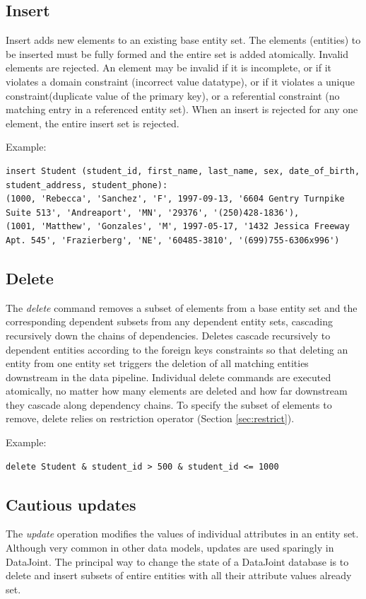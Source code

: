\documentclass[letter,10pt]{article}
\newcommand{\datajoint}{DataJoint\xspace}
\begin{document}
\subsection{Insert}
Insert adds new elements to an existing base entity set.  
The elements (entities) to be inserted must be fully formed and the entire set is added atomically.
Invalid elements are rejected. 
An element may be invalid if it is incomplete, or if it violates a domain constraint (incorrect value datatype), or if it violates a unique constraint(duplicate value of the primary key), or a referential constraint (no matching entry in a referenced entity set).
When an insert is rejected for any one element, the entire insert set is rejected.

Example:
\begin{lstlisting}[language=dj]
insert Student (student_id, first_name, last_name, sex, date_of_birth, student_address, student_phone):
(1000, 'Rebecca', 'Sanchez', 'F', 1997-09-13, '6604 Gentry Turnpike Suite 513', 'Andreaport', 'MN', '29376', '(250)428-1836'),
(1001, 'Matthew', 'Gonzales', 'M', 1997-05-17, '1432 Jessica Freeway Apt. 545', 'Frazierberg', 'NE', '60485-3810', '(699)755-6306x996')
\end{lstlisting}

\subsection{Delete}\label{sec:delete}
The \emph{delete} command removes a subset of elements from a base entity set and the corresponding dependent subsets from any dependent entity sets, cascading recursively down the chains of dependencies.
Deletes cascade recursively to dependent entities according to the foreign keys constraints so that deleting an entity from one entity set triggers the deletion of all matching entities downstream in the data pipeline.
Individual delete commands are executed atomically, no matter how many elements are deleted and how far downstream they cascade along dependency chains.
To specify the subset of elements to remove, delete relies on restriction operator (Section \ref{sec:restrict}).

Example: 
\begin{lstlisting}[language=dj]
delete Student & student_id > 500 & student_id <= 1000
\end{lstlisting}

\subsection{Cautious updates}
The \emph{update} operation modifies the values of individual attributes in an entity set.
Although very common in other data models, updates are used sparingly in \datajoint. 
The principal way to change the state of a \datajoint database is to delete and insert subsets of entire entities with all their attribute values already set. 
\end{document}
